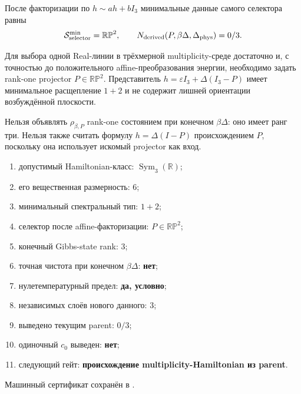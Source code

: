После факторизации по $h\sim ah+bI_3$ минимальные данные самого селектора
равны
\begin{equation}
 \mathcal S_{\rm selector}^{\min}=\mathbb{RP}^2,
 \qquad
 N_{\rm derived}(P,\beta\Delta,\Delta_{\rm phys})=0/3.
 \label{eq:v8-baryon-c0-minimal-hamiltonian-data-ledger}
\end{equation}

\begin{theorem}
Для выбора одной Real-линии в трёхмерной multiplicity-среде достаточно и,
с точностью до положительного affine-преобразования энергии, необходимо
задать rank-one projector $P\in\mathbb{RP}^2$. Представитель
$h=\varepsilon I_3+\Delta(I_3-P)$ имеет минимальное расщепление $1+2$ и не
содержит лишней ориентации возбуждённой плоскости.
\end{theorem}

\begin{nogocriterion}
Нельзя объявлять $\rho_{\beta,P}$ rank-one состоянием при конечном
$\beta\Delta$: оно имеет ранг три. Нельзя также считать формулу
$h=\Delta(I-P)$ происхождением $P$, поскольку она использует искомый
projector как вход.
\end{nogocriterion}

\begin{protocol}\begin{enumerate}
\item допустимый Hamiltonian-класс: \textbf{$\operatorname{Sym}_3(\mathbb R)$};
\item его вещественная размерность: \textbf{$6$};
\item минимальный спектральный тип: \textbf{$1+2$};
\item селектор после affine-факторизации: \textbf{$P\in\mathbb{RP}^2$};
\item конечный Gibbs-state rank: \textbf{$3$};
\item точная чистота при конечном $\beta\Delta$: \textbf{нет};
\item нулетемпературный предел: \textbf{да, условно};
\item независимых слоёв нового данного: \textbf{$3$};
\item выведено текущим parent: \textbf{$0/3$};
\item одиночный $c_0$ выведен: \textbf{нет};
\item следующий гейт: \textbf{происхождение multiplicity-Hamiltonian из parent}.
\end{enumerate}\end{protocol}

Машинный сертификат сохранён в
.